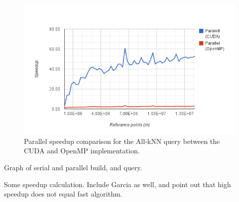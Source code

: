 \begin{figure}[ht]
    \centering
    \includegraphics[width=120mm]{../gfx/final_kd_search_speedup.png}
    \caption{Parallel speedup comparison for the All-kNN query between the CUDA and OpenMP implementation.}
    \label{fig:final_kd_search_speedup}
\end{figure}



Graph of serial and parallel build, and query.

Some speedup calculation. Include Garcia as well, and point out that high speedup does not equal fast algorithm.
